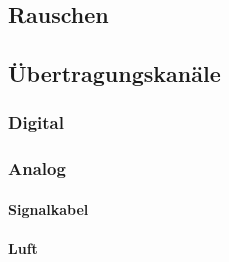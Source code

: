 \subsection{Rauschen}

\subsection{Übertragungskanäle}

\subsubsection{Digital}

\subsubsection{Analog}

\paragraph{Signalkabel}

\paragraph{Luft}






